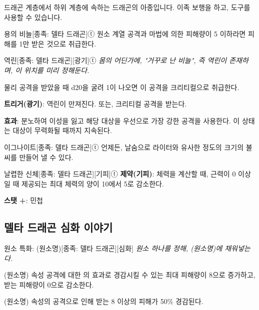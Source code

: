 \documentclass{report}
\begin{document}
	드래곤 계층에서 하위 계층에 속하는 드래곤의 아종입니다. 이족 보행을 하고, 도구를 사용할 수 있습니다.
	
	\begin{story}{용의 비늘}{[종족: 델타 드래곤]ⓣ}
		원소 계열 공격과 마법에 의한 피해량이 5 이하라면 피해를 1만 받은 것으로 취급한다.
		
	\end{story}
	
	\begin{story}{역린}{[종족: 델타 드래곤][광기]ⓣ}
		\textit{몸의 어딘가에, "거꾸로 난 비늘", 즉 \emph{역린}이 존재하며, 이 위치를 미리 정해둔다.}
		
		물리 공격을 받았을 때 d20을 굴려 1이 나오면 이 공격을 크리티컬으로 취급한다.
		
		\textbf{트리거(광기)}: 역린이 만져진다. 또는, 크리티컬 공격을 받는다.
		
		\textbf{효과}: 분노하여 이성을 잃고 해당 대상을 우선으로 가장 강한 공격을 사용한다. 이 상태는 대상이 무력화될 때까지 지속된다.
		
	\end{story}
	
	\begin{story}{이그나이트}{[종족: 델타 드래곤]ⓣ}
		언제든, 날숨으로 라이터와 유사한 정도의 크기의 불씨를 만들어 낼 수 있다.
		
	\end{story}
	
	\begin{story}{날렵한 신체}{[종족: 델타 드래곤][기피]ⓣ}
		\textbf{제약(기피)}: 체력을 계산할 때, 근력이 0 이상일 때 제공되는 최대 체력의 양이 10에서 5로 감소한다.
		
		\textbf{스탯 +}: 민첩
		
	\end{story}
	
	\subsection{델타 드래곤 심화 이야기}
	
	\begin{story}{원소 특화: (원소명)}{[종족: 델타 드래곤][심화]}
		\textit{원소 하나를 정해, (원소명)에 채워넣는다.}
		
		(원소명) 속성 공격에 대한 의 효과로 경감시킬 수 있는 최대 피해량이 8으로 증가하고, 받는 피해량이 0으로 감소한다.
		
		(원소명) 속성의 공격으로 인해 받는 8 이상의 피해가 50\% 경감된다.
		
	\end{story}
\end{document}
